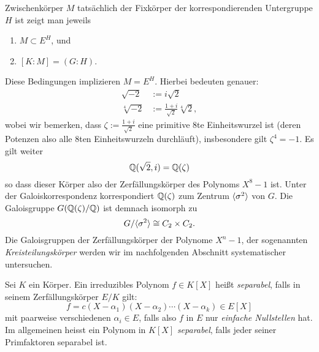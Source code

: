 \documentclass{book}
\begin{document}
\begin{exa}
    Zwischenkörper $M$ tatsächlich der Fixkörper der korrespondierenden
    Untergruppe $H$ ist zeigt man jeweils
    \begin{enumerate}[label = \arabic *.]
        \item $M \subset E^H$, und
        \item $[K:M] = (G:H)$.
    \end{enumerate}
    Diese Bedingungen implizieren $M = E^H$. Hierbei bedeuten genauer:
    \begin{align*}
        \sqrt{-2} & := i \sqrt{2}\\
        \sqrt[4]{-2} & := \frac{1+i}{\sqrt{2}}\sqrt[4]{2},
    \end{align*}
    wobei wir bemerken, dass $\zeta := \frac{1+i}{\sqrt{2}}$ eine primitive
    $8$te Einheitswurzel ist (deren Potenzen also alle $8$ten Einheitswurzeln
    durchläuft), insbesondere gilt $\zeta^4 = -1$. Es gilt weiter
    \[
        \mathbb{Q}(\sqrt{2}, i) = \mathbb{Q}(\zeta) 
    \]
    so dass dieser Körper also der Zerfällungskörper des Polynoms $X^8 - 1$
    ist. Unter der Galoiskorrespondenz korrespondiert $\mathbb{Q}(\zeta)$ zum Zentrum
    $\langle \sigma^2 \rangle$ von $G$. Die Galoisgruppe $G(\mathbb{Q}(\zeta)/\mathbb{Q})$ ist demnach
    isomorph zu
    \[
        G/\langle \sigma^2 \rangle \cong C_2 \times C_2.
    \]
    Die Galoisgruppen der Zerfällungskörper der Polynome $X^n -1$, der
    sogenannten {\em Kreisteilungskörper} werden wir im nachfolgenden Abschnitt
    systematischer untersuchen.
\end{exa}

\begin{defi}
    \label{defi:sep}
    Sei $K$ ein Körper. Ein irreduzibles Polynom $f \in K[X]$ heißt \emph{separabel}, falls in seinem Zerfällungskörper $E/K$ gilt:
    \[
        f = c (X-\alpha_1)(X-\alpha_2) \cdots (X-\alpha_k) \in E[X]
    \]
    mit paarweise verschiedenen $\alpha_i \in E$, falls also $f$ in $E$ nur
    \emph{einfache Nullstellen} hat. Im allgemeinen heisst ein Polynom in $K[X]$ \emph{separabel},
    falls jeder seiner Primfaktoren separabel ist. 
\end{defi}
\end{document}
